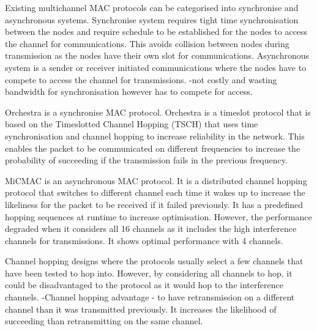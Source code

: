 
Existing multichannel MAC protocols can be categorised into synchronise and asynchronous systems. Synchronise system requires tight time synchronisation between the nodes and require schedule to be established for the nodes to access the channel for communications. This avoids collision between nodes during transmission as the nodes have their own slot for communications. Asynchronous system is a sender or receiver initiated communications where the nodes have to compete to access the channel for transmissions. 
-not costly and wasting bandwidth for synchronisation however has to compete for access.

Orchestra is a synchronise MAC protocol. Orchestra is a timeslot protocol that is based on the Timeslotted Channel Hopping (TSCH) that uses time synchronisation and channel hopping to increase reliability in the network. This enables the packet to be communicated on different frequencies to increase the probability of succeeding if the transmission fails in the previous frequency. 

MiCMAC is an asynchronous MAC protocol. It is a distributed channel hopping protocol that switches to different channel each time it wakes up to increase the likeliness for the packet to be received if it failed previously. It has a predefined hopping sequences at runtime to increase optimisation. However, the performance degraded when it considers all 16 channels as it includes the high interference channels for transmissions. It shows optimal performance with 4 channels.

Channel hopping designs where the protocols usually select a few channels that have been tested to hop into. However, by considering all channels to hop, it could be disadvantaged to the protocol as it would hop to the interference channels.
-Channel hopping advantage - to have retransmission on a different channel than it was transmitted previously. It increases the likelihood of succeeding than retransmitting on the same channel. 



